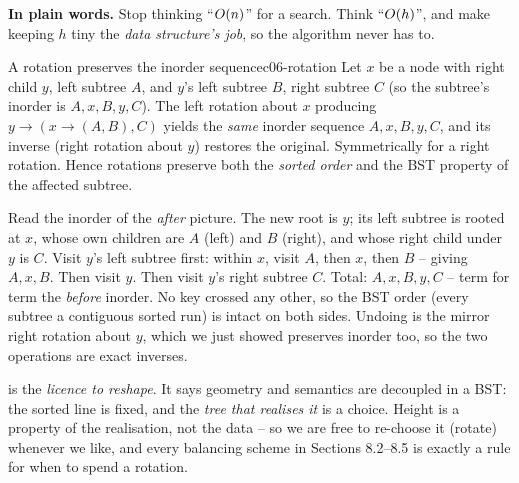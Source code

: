 \noindent\textbf{In plain words.} Stop thinking ``$O(n)$'' for a search. Think ``$O(h)$'',
and make keeping $h$ tiny the \emph{data structure's job}, so the algorithm never has to.

\begin{theorem}{A rotation preserves the inorder sequence}{c06-rotation}
Let $x$ be a node with right child $y$, left subtree $A$, and $y$'s left subtree $B$, right subtree
$C$ (so the subtree's inorder is $A,x,B,y,C$). The left rotation about $x$ producing $y\to(x\to(A,B),C)$
yields the \emph{same} inorder sequence $A,x,B,y,C$, and its inverse (right rotation about $y$) restores
the original. Symmetrically for a right rotation. Hence rotations preserve both the \emph{sorted
order} and the BST property of the affected subtree.
\end{theorem}
\begin{proofbox}
Read the inorder of the \emph{after} picture. The new root is $y$; its left subtree is rooted at $x$,
whose own children are $A$ (left) and $B$ (right), and whose right child under $y$ is $C$. Visit $y$'s
left subtree first: within $x$, visit $A$, then $x$, then $B$ -- giving $A,x,B$. Then visit $y$. Then
visit $y$'s right subtree $C$. Total: $A,x,B,y,C$ -- term for term the \emph{before} inorder. No key
crossed any other, so the BST order (every subtree a contiguous sorted run) is intact on both sides.
Undoing is the mirror right rotation about $y$, which we just showed preserves inorder too, so the two
operations are exact inverses. \end{proofbox}
\begin{insightbox}
 is the \emph{licence to reshape}. It says geometry and semantics are decoupled
in a BST: the sorted line is fixed, and the \emph{tree that realises it} is a choice. Height is a
property of the realisation, not the data -- so we are free to re-choose it (rotate) whenever we
like, and every balancing scheme in Sections 8.2--8.5 is exactly a rule for when to spend a rotation.
\end{insightbox}

